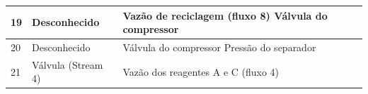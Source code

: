 \documentclass[
	12pt,				%
	openright,			%
	oneside,			%
	a4paper,			%
	english,			%
	french,				%
	spanish,			%
	brazil				%
	]{abntex2}
\begin{document}
\begin{apendicesenv}
\begin{table}[!htbp]
\begin{tabularx}{\textwidth}{|l|X|X|}
      19                      & Desconhecido                                          & Vazão de reciclagem (fluxo 8) \newline Válvula do compressor                             \\ \hline
      20                      & Desconhecido                                          & Válvula do compressor \newline Pressão do separador                                      \\ \hline
      21                      & Válvula (Stream 4)                                    & Vazão dos reagentes A e C (fluxo 4)                                                      \\ \hline
    \end{tabularx}
    \label{tbl-failure-feature-tep}
  \end{table}

\end{apendicesenv}



\printindex

\end{document}
